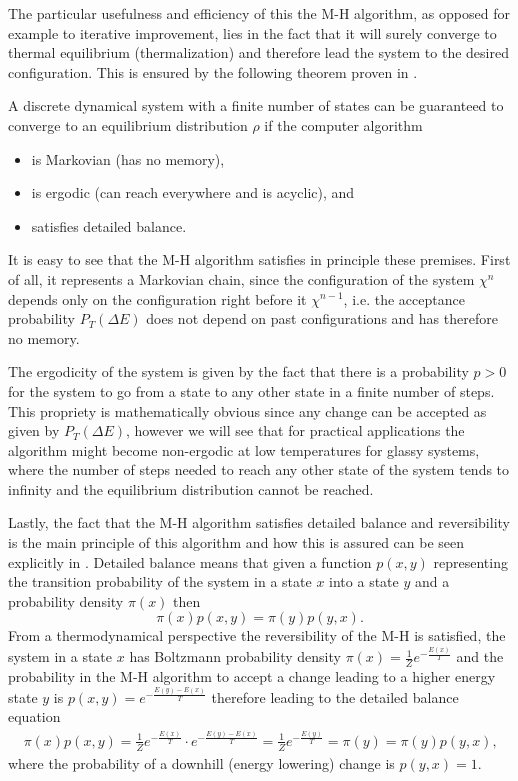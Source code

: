 The particular usefulness and efficiency of this the M-H algorithm, as opposed for example to iterative improvement, lies in the fact that it will surely converge to thermal equilibrium (thermalization) and therefore lead the system to the desired configuration.
This is ensured by the following theorem proven in \cite{Sethna}.
\begin{theorem}\label{th:equilibrium}
  A discrete dynamical system with a finite number of states can be guaranteed to converge to an equilibrium distribution $\rho$ if the computer algorithm
  \begin{itemize}
    \item is Markovian (has no memory),
    \item is ergodic (can reach everywhere and is acyclic), and
    \item satisfies detailed balance.
  \end{itemize}
\end{theorem}

It is easy to see that the M-H algorithm satisfies in principle these premises.
First of all, it represents a Markovian chain, since the configuration of the system $\chi^{n}$ depends only on the configuration right before it $\chi^{n-1}$, i.e. the acceptance probability $P_T(\Delta E)$ does not depend on past configurations and has therefore no memory.

The ergodicity of the system is given by the fact that there is a probability $p>0$ for the system to go from a state to any other state in a finite number of steps.
This propriety is mathematically obvious since any change can be accepted as given by $P_T(\Delta E)$, however we will see that for practical applications the algorithm might become non-ergodic at low temperatures for glassy systems, where the number of steps needed to reach any other state of the system tends to infinity and the equilibrium distribution cannot be reached.

Lastly, the fact that the M-H algorithm satisfies detailed balance and reversibility is the main principle of this algorithm and how this is assured can be seen explicitly in \cite{M-H_algorithm}.
Detailed balance means that given a function $p(x,y)$ representing the transition probability of the system in a state $x$ into a state $y$ and a probability density $\pi(x)$ then
\begin{equation}
  \pi(x)p(x,y)=\pi(y)p(y,x) \text{.}
\end{equation}
From a thermodynamical perspective the reversibility of the M-H is satisfied, the system in a state $x$ has Boltzmann probability density $\pi(x)=\frac{1}{Z}e^{-\frac{E(x)}{T}}$ and the probability in the M-H algorithm to accept a change leading to a higher energy state $y$ is $p(x,y) = e^{-\frac{E(y)-E(x)}{T}}$ therefore leading to the detailed balance equation
\begin{align}
  \pi(x)p(x,y) = \frac{1}{Z} e^{-\frac{E(x)}{T}} \cdot e^{-\frac{E(y)-E(x)}{T}}
  = \frac{1}{Z} e^{-\frac{E(y)}{T}} = \pi(y) = \pi(y) p(y,x) \text{,}
\end{align}
where the probability of a downhill (energy lowering) change is $p(y,x)=1$.

